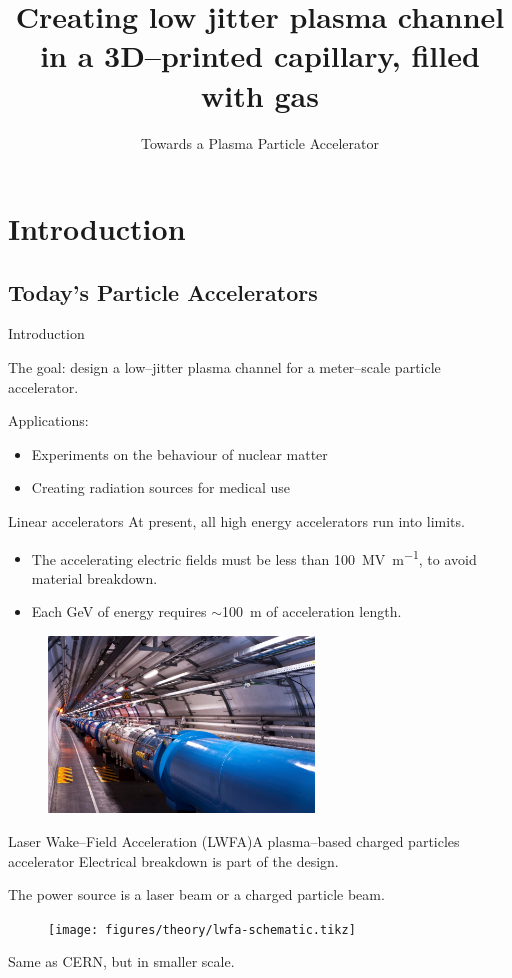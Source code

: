 \documentclass[dvipsnames]{beamer}
\title{Creating low jitter plasma channel in a 3D--printed capillary, filled with gas}
\subtitle{Towards a Plasma Particle Accelerator}
\author{{Ehud Behar} \\
{\and} \\
{\textit{Supervisors:}} \\
{Dr. Amir Capua and Prof. Arie Zigler}}
\institute{The Hebrew University of Jerusalem}
\date{}
\begin{document}
\frame{\titlepage}

\section{Introduction}
\subsection[]{Today's Particle Accelerators}
  \begin{frame}{Introduction}
  \begin{center}
    The goal: design a low--jitter plasma channel for a meter--scale particle accelerator.
  \end{center}
    Applications:
    \begin{itemize}
        \item[\textbullet] Experiments on the behaviour of nuclear matter
        \item[\textbullet] Creating radiation sources for medical use
    \end{itemize}
  \end{frame}

\begin{frame}{Linear accelerators}
At present, all high energy accelerators run into limits.
\begin{itemize}
\item[\textbullet] The accelerating electric fields must be less than \SI[per-mode=symbol]{100}{\mega \V \per\meter}, to avoid material breakdown.
\item[\textbullet] Each \si{\giga \eV} of energy requires $\sim$\SI{100}{\meter} of acceleration length.
\end{itemize}
\begin{figure}
\includegraphics[width=200pt]{figures/theory/lhc_cern_compressed.jpg}
\end{figure}
\end{frame}
\begin{frame}{Laser Wake--Field Acceleration (LWFA)}{A plasma--based charged particles accelerator}
Electrical breakdown is part of the design.

The power source is a laser beam or a charged particle beam.
\begin{figure}
\texttt{[image: figures/theory/lwfa-schematic.tikz]}
\end{figure}
Same as CERN, but in smaller scale.
\end{frame}
\end{document}

